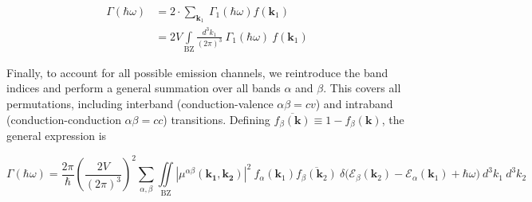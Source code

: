 \begin{align}
\Gamma (\hbar\omega) &= 2\cdot \sum_{\mathbf{k}_{1}} \ \Gamma_{1}(\hbar\omega) f(\mathbf{k}_{1}) \\
&= 2V \int\limits_{\text{BZ}} \frac{d^{3}k_{1}}{(2\pi)^{3}} \ \Gamma_{1}(\hbar\omega) \ f(\mathbf{k}_{1}) 
\label{eq:continuum_total_rate}
\end{align}

Finally, to account for all possible emission channels, we reintroduce the band indices and perform a general summation over all bands $\alpha$ and $\beta$. This covers all permutations, including interband (conduction-valence $\alpha\beta = cv$) and intraband (conduction-conduction $\alpha\beta =cc$) transitions. Defining $\overline{f_{\beta}(\mathbf{k})} \equiv 1 - f_{\beta}(\mathbf{k})$, the general expression is

\begin{equation}
\boxed{ \Gamma(\hbar\omega) = \frac{2\pi}{\hbar} \left( \frac{2V}{(2\pi)^{3}} \right)^{2} \sum_{\alpha, \beta} \iint\limits_{\text{BZ}} |\mu^{\alpha\beta}(\mathbf{k_{1}},\mathbf{k_{2}})|^{2} \ f_{\alpha}(\mathbf{k}_{1})\overline{f_{\beta}(\mathbf{k}_{2})} \ \delta\big(\mathcal{E}_{\beta}(\mathbf{k}_{2}) - \mathcal{E}_{\alpha}(\mathbf{k}_{1}) + \hbar\omega \big) \ d^{3}k_{1} \ d^{3}k_{2} }
\label{eq:general_emission_integral}
\end{equation}
